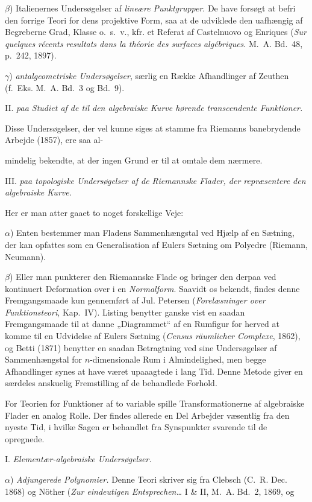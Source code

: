 \documentclass{article}
\begin{document}
$\beta$) Italienernes Undersøgelser af \emph{lineære Punktgrupper}. De have forsøgt at befri den forrige Teori for dens projektive Form, saa at de udviklede den uafhængig af Begreberne Grad, Klasse o.~s.~v., kfr. et Referat af Castelnuovo og Enriques (\emph{Sur quelques récents resultats dans la théorie des surfaces algébriques}. M.~A. Bd.~48, p.~242, 1897).

$\gamma$) \emph{antalgeometriske Undersøgelser}, særlig en Række Afhandlinger af Zeuthen (f.~Eks. M.~A. Bd.~3 og Bd.~9).

II. \emph{paa Studiet af de til den algebraiske Kurve hørende transcendente Funktioner.}

Disse Undersøgelser, der vel kunne siges at stamme fra Riemanns banebrydende Arbejde (1857), ere saa al-

mindelig bekendte, at der ingen Grund er til at omtale dem nærmere.

III. \emph{paa topologiske Undersøgelser af de Riemannske Flader, der repræsentere den algebraiske Kurve.}

Her er man atter gaaet to noget forskellige Veje:

$\alpha$) Enten bestemmer man Fladens Sammenhængstal ved Hjælp af en Sætning, der kan opfattes som en Generalisation af Eulers Sætning om Polyedre (Riemann, Neumann).

$\beta$) Eller man punkterer den Riemannske Flade og bringer den derpaa ved kontinuert Deformation over i en \emph{Normalform}. Saavidt os bekendt, findes denne Fremgangsmaade kun gennemført af Jul. Petersen (\emph{Forelæsninger over Funktionsteori}, Kap.~IV). Listing benytter ganske vist en saadan Fremgangsmaade til at danne „Diagrammet“ af en Rumfigur for herved at komme til en Udvidelse af Eulers Sætning (\emph{Census räumlicher Complexe}, 1862), og Betti (1871) benytter en saadan Betragtning ved sine Undersøgelser af Sammenhængstal for $n$-dimensionale Rum i Almindelighed, men begge Afhandlinger synes at have været upaaagtede i lang Tid. Denne Metode giver en særdeles anskuelig Fremstilling af de behandlede Forhold.

For Teorien for Funktioner af to variable spille Transformationerne af algebraiske Flader en analog Rolle. Der findes allerede en Del Arbejder væsentlig fra den nyeste Tid, i hvilke Sagen er behandlet fra Synspunkter svarende til de opregnede.

I. \emph{Elementær-algebraiske Undersøgelser.}

$\alpha$) \emph{Adjungerede Polynomier.} Denne Teori skriver sig fra Clebsch (C.~R. Dec. 1868) og Nöther (\emph{Zur eindeutigen Entsprechen\dots} I \& II, M.~A. Bd.~2, 1869, og
\end{document}
